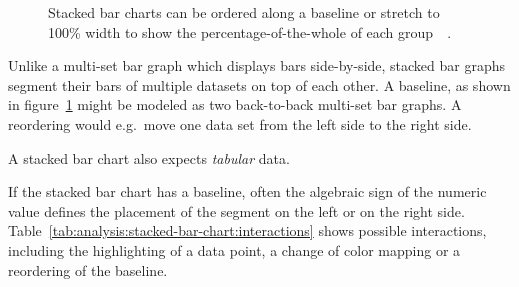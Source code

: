 \begin{figure}
  \centering
  \qquad
  \caption{Stacked bar charts can be ordered along a baseline or stretch to 100\% width to show the percentage-of-the-whole of each group~\parencite{Mann2017}~\parencite{Peltier2017}.}%
  \label{fig:analysis:stacked-bar-chart}
\end{figure}

Unlike a multi-set bar graph which displays bars side-by-side, stacked bar graphs segment their bars of multiple datasets on top of each other.
A baseline, as shown in figure~\ref{fig:analysis:stacked-bar-chart} might be modeled as two back-to-back multi-set bar graphs. A reordering would e.g.\ move one data set from the left side to the right side.

A stacked bar chart also expects \emph{tabular} data.

If the stacked bar chart has a baseline, often the algebraic sign of the numeric value defines the placement of the segment on the left or on the right side.
Table~\ref{tab:analysis:stacked-bar-chart:interactions} shows possible interactions, including the highlighting of a data point, a change of color mapping or a reordering of the baseline.

